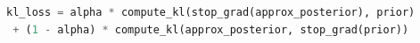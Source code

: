 \begin{algorithm}[b]
\fontsize{9.5}{12}\selectfont
\vspace*{-.8ex}
\begin{lstlisting}[language=Python]
kl_loss = alpha * compute_kl(stop_grad(approx_posterior), prior)
 + (1 - alpha) * compute_kl(approx_posterior, stop_grad(prior))
\end{lstlisting}
\vspace*{-.8ex}
\caption{使用自动微分实现 KL 平衡}
\label{alg:klbalancing}
\end{algorithm}

